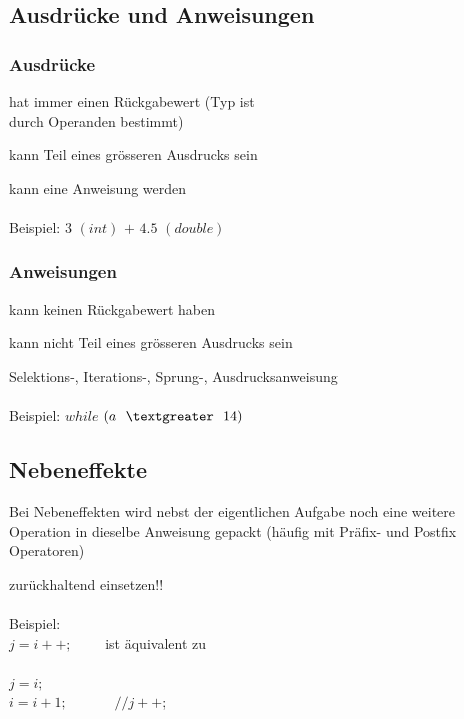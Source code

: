		\begin{minipage}[t]{8 cm}	
			\subsection{Ausdrücke und Anweisungen}
				\subsubsection{Ausdrücke}
					\begin{compactitem}
						\item hat immer einen Rückgabewert (Typ ist\\ durch Operanden bestimmt)
						\item kann Teil eines grösseren Ausdrucks sein
						\item kann eine Anweisung werden\\\\Beispiel: $3$ $(int)$ $+$ $4.5$ $(double)$
					\end{compactitem}
				\subsubsection{Anweisungen}
					\begin{compactitem}
						\item kann keinen Rückgabewert haben
						\item kann nicht Teil eines grösseren Ausdrucks sein
						\item Selektions-, Iterations-, Sprung-, Ausdrucksanweisung\\\\
						Beispiel: $while$ $(a\ \ \textgreater\ \ 14)$
					\end{compactitem}
		\end{minipage}
		\hspace*{1cm}
		\begin{minipage}[t]{9 cm}
			\subsection{Nebeneffekte}
				\begin{compactitem}
					\item Bei Nebeneffekten wird nebst der eigentlichen Aufgabe noch eine weitere
					Operation in dieselbe Anweisung gepackt (häufig mit Präfix- und Postfix Operatoren)
					\item zurückhaltend einsetzen!!\\\\
					Beispiel:\\
					$j = i++;$
					\ \ \ \ ist äquivalent zu\\\\
					$j = i;$\\
					$i = i+1;$ \ \ \ \ \ \ $// j++$; 	
				\end{compactitem}
		\end{minipage}
